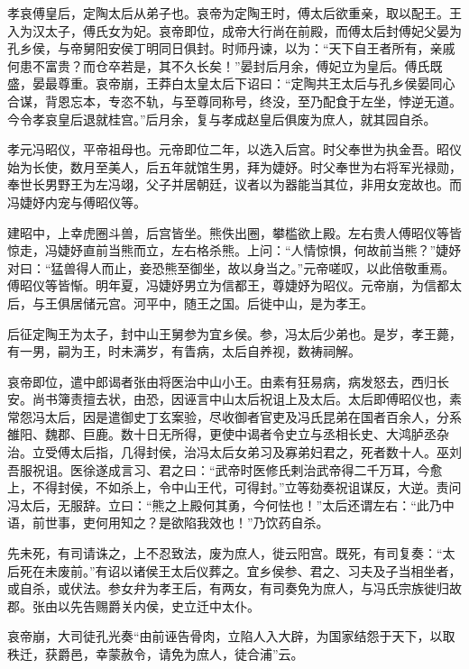 \documentclass[12pt,UTF8]{ctexbook}
\begin{document}
孝哀傅皇后，定陶太后从弟子也。哀帝为定陶王时，傅太后欲重亲，取以配王。王入为汉太子，傅氏女为妃。哀帝即位，成帝大行尚在前殿，而傅太后封傅妃父晏为孔乡侯，与帝舅阳安侯丁明同日俱封。时师丹谏，以为：“天下自王者所有，亲戚何患不富贵？而仓卒若是，其不久长矣！”晏封后月余，傅妃立为皇后。傅氏既盛，晏最尊重。哀帝崩，王莽白太皇太后下诏曰：“定陶共王太后与孔乡侯晏同心合谋，背恩忘本，专恣不轨，与至尊同称号，终没，至乃配食于左坐，悖逆无道。今令孝哀皇后退就桂宫。”后月余，复与孝成赵皇后俱废为庶人，就其园自杀。



孝元冯昭仪，平帝祖母也。元帝即位二年，以选入后宫。时父奉世为执金吾。昭仪始为长使，数月至美人，后五年就馆生男，拜为婕妤。时父奉世为右将军光禄勋，奉世长男野王为左冯翊，父子并居朝廷，议者以为器能当其位，非用女宠故也。而冯婕妤内宠与傅昭仪等。



建昭中，上幸虎圈斗兽，后宫皆坐。熊佚出圈，攀槛欲上殿。左右贵人傅昭仪等皆惊走，冯婕妤直前当熊而立，左右格杀熊。上问：“人情惊惧，何故前当熊？”婕妤对曰：“猛兽得人而止，妾恐熊至御坐，故以身当之。”元帝嗟叹，以此倍敬重焉。傅昭仪等皆惭。明年夏，冯婕妤男立为信都王，尊婕妤为昭仪。元帝崩，为信都太后，与王俱居储元宫。河平中，随王之国。后徙中山，是为孝王。



后征定陶王为太子，封中山王舅参为宜乡侯。参，冯太后少弟也。是岁，孝王薨，有一男，嗣为王，时未满岁，有眚病，太后自养视，数祷祠解。



哀帝即位，遣中郎谒者张由将医治中山小王。由素有狂易病，病发怒去，西归长安。尚书簿责擅去状，由恐，因诬言中山太后祝诅上及太后。太后即傅昭仪也，素常怨冯太后，因是遣御史丁玄案验，尽收御者官吏及冯氏昆弟在国者百余人，分系雒阳、魏郡、巨鹿。数十日无所得，更使中谒者令史立与丞相长史、大鸿胪丞杂治。立受傅太后指，几得封侯，治冯太后女弟习及寡弟妇君之，死者数十人。巫刘吾服祝诅。医徐遂成言习、君之曰：“武帝时医修氏剌治武帝得二千万耳，今愈上，不得封侯，不如杀上，令中山王代，可得封。”立等劾奏祝诅谋反，大逆。责问冯太后，无服辞。立曰：“熊之上殿何其勇，今何怯也！”太后还谓左右：“此乃中语，前世事，吏何用知之？是欲陷我效也！”乃饮药自杀。



先未死，有司请诛之，上不忍致法，废为庶人，徙云阳宫。既死，有司复奏：“太后死在未废前。”有诏以诸侯王太后仪葬之。宜乡侯参、君之、习夫及子当相坐者，或自杀，或伏法。参女弁为孝王后，有两女，有司奏免为庶人，与冯氏宗族徙归故郡。张由以先告赐爵关内侯，史立迁中太仆。



哀帝崩，大司徒孔光奏“由前诬告骨肉，立陷人入大辟，为国家结怨于天下，以取秩迁，获爵邑，幸蒙赦令，请免为庶人，徒合浦”云。
\end{document}
